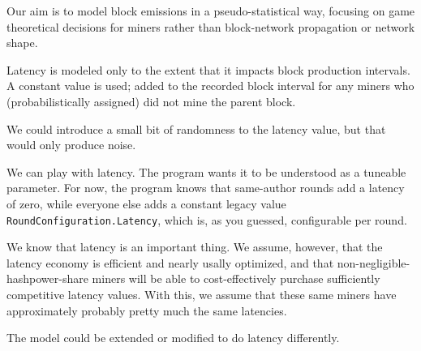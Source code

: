 \documentclass[11pt]{article}
\begin{document}
	Our aim is to model block emissions in a pseudo-statistical way,
	focusing on game theoretical decisions for miners rather than
	block-network propagation or network shape.

	Latency is modeled only to the extent that it impacts block production
	intervals. A constant value is used; added to the recorded block interval
	for any miners who (probabilistically assigned) did not mine the
	parent block.

%
%

%

	We could introduce a small bit of randomness to the latency value, but that
	would only produce noise.

	We can play with latency. The program wants it to be understood as a tuneable
	parameter. For now, the program knows that same-author rounds add a latency of
	zero, while everyone else adds a constant legacy value
	\texttt{RoundConfiguration.Latency}, which is, as you guessed, configurable per
	round.

	We know that latency is an important thing.
	We assume, however, that the latency economy is efficient and nearly usally
	optimized,
	and that non-negligible-hashpower-share miners will be able to cost-effectively
	purchase sufficiently competitive latency values. With this, we assume that
	these same miners have approximately probably pretty much the same latencies.

	The model could be extended or modified to do latency differently.
\end{document}
